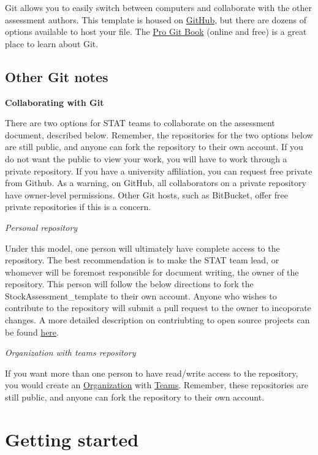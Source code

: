 \documentclass[12pt,]{article}
\begin{document}
Git allows you to easily switch between computers and collaborate with
the other assessment authors. This template is housed on
\href{https://github.com/}{GitHub}, but there are dozens of options
available to host your file. The
\href{http://git-scm.com/book/en/v2}{Pro Git Book} (online and free) is
a great place to learn about Git.

\subsection{Other Git notes}\label{other-git-notes}

\textbf{Collaborating with Git}

There are two options for STAT teams to collaborate on the assessment
document, described below. Remember, the repositories for the two
options below are still public, and anyone can fork the repository to
their own account. If you do not want the public to view your work, you
will have to work through a private repository. If you have a university
affiliation, you can request free private from Github. As a warning, on
GitHub, all collaborators on a private repository have owner-level
permissions. Other Git hosts, such as BitBucket, offer free private
repositories if this is a concern.

\emph{Personal repository}

Under this model, one person will ultimately have complete access to the
repository. The best recommendation is to make the STAT team lead, or
whomever will be foremost responsible for document writing, the owner of
the repository. This person will follow the below directions to fork the
StockAssessment\_template to their own account. Anyone who wishes to
contribute to the repository will submit a pull request to the owner to
incoporate changes. A more detailed description on contriubting to open
source projects can be found
\href{https://guides.github.com/activities/contributing-to-open-source/}{here}.

\emph{Organization with teams repository}

If you want more than one person to have read/write access to the
repository, you would create an
\href{https://help.github.com/articles/creating-a-new-organization-account/}{Organization}
with
\href{https://help.github.com/articles/permission-levels-for-an-organization-repository/}{Teams}.
Remember, these repositories are still public, and anyone can fork the
repository to their own account.

\section{Getting started}\label{getting-started}
\end{document}
